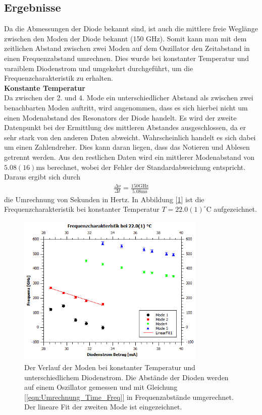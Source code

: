 \documentclass[a4paper,10pt]{scrartcl} %
\begin{document}
\subsection{Ergebnisse}
\label{subsec:Freq_Ergebnisse }
Da die Abmessungen der Diode bekannt sind, ist auch die mittlere freie Weglänge zwischen den Moden der Diode bekannt (150 GHz). Somit kann man mit dem zeitlichen Abstand zwischen zwei Moden auf dem Oszillator den Zeitabstand in einen Frequenzabstand umrechnen. Dies wurde bei konstanter Temperatur und varaiblem Diodenstrom und umgekehrt durchgeführt, um die Frequenzcharakteristik zu erhalten.\\
\textbf{Konstante Temperatur}\\
Da zwischen der 2. und 4. Mode ein unterschiedlicher Abstand als zwischen zwei benachbarten Moden auftritt, wird angenommen, dass es sich hierbei nicht um einen Modenabstand des Resonators der Diode handelt. Es wird der zweite Datenpunkt bei der Ermittlung des mittleren Abstandes ausgeschlossen, da er sehr stark von den anderen Daten abweicht. Wahrscheinlich handelt es sich dabei um einen Zahlendreher. Dies kann daran liegen, dass das Notieren und Ablesen getrennt werden. Aus den restlichen Daten wird ein mittlerer Modenabstand von $5.08(16) \text{ms}$ berechnet, wobei der Fehler der Standardabweichung entspricht. Daraus ergibt sich durch
\begin{align}
\label{eqn:Umrechnung_Time_Freq}
\frac{\Delta \nu}{\Delta t} = \frac{150 \text{GHz}}{5.08 \text{ms}}
\end{align}
die Umrechnung von Sekunden in Hertz. In Abbildung [\ref{fig:2_const_T}] ist die Frequenzcharakteristik bei konstanter Temperatur $T = 22.0(1) ^\circ{\text{C}}$ aufgezeichnet.
\begin{figure}
\centering
\includegraphics[width=0.8\textwidth]{Bilder/Frequenzchar_1.png}
\caption{Der Verlauf der Moden bei konstanter Temperatur und unterschiedlichem Diodenstrom. Die Abstände der Dioden werden auf einem Oszillator gemessen und mit Gleichung [\ref{eqn:Umrechnung_Time_Freq}] in Frequenzabstände umgerechnet. Der lineare Fit der zweiten Mode ist eingezeichnet.}
\label{fig:2_const_T}
\end{figure}
\end{document}
